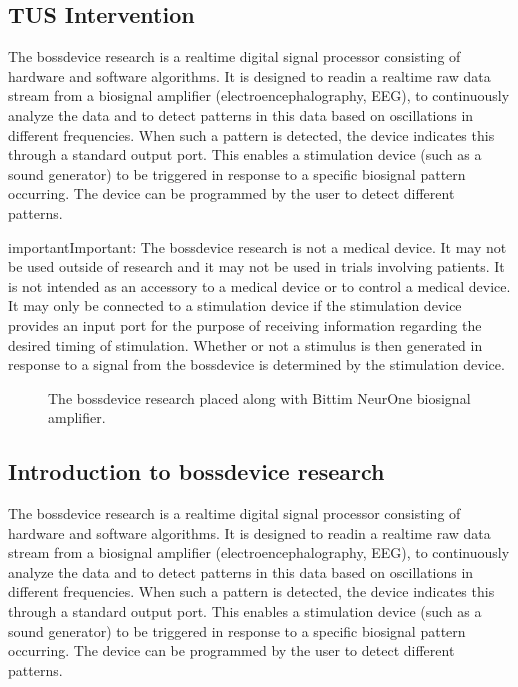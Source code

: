 \documentclass[letterpaper,10pt,english]{sphinxmanual}
\begin{document}
\subsection{TUS Intervention}
\label{\detokenize{13_TUSIntervention:tus-intervention}}\label{\detokenize{13_TUSIntervention::doc}}
\sphinxAtStartPar
The bossdevice research is a real\sphinxhyphen{}time digital signal processor consisting of hardware and software algorithms. It is designed to read\sphinxhyphen{}in a real\sphinxhyphen{}time raw data stream from a biosignal amplifier (electroencephalography, EEG), to continuously analyze the data and to detect patterns in this data based on oscillations in different frequencies. When such a pattern is detected, the device indicates this through a standard output port. This enables a stimulation device (such as a sound generator) to be triggered in response to a specific biosignal pattern occurring. The device can be programmed by the user to detect different patterns.

\begin{sphinxadmonition}{important}{Important:}
\sphinxAtStartPar
The bossdevice research is not a medical device. It may not be used outside of research and it may not be used in trials involving patients. It is not intended as an accessory to a medical device or to control a medical device. It may only be connected to a stimulation device if the stimulation device provides an input port for the purpose of receiving information regarding the desired timing of stimulation. Whether or not a stimulus is then generated in response to a signal from the bossdevice is determined by the stimulation device.
\end{sphinxadmonition}

\begin{figure}[htbp]
\centering
\capstart

\noindent{}
\caption{The bossdevice research placed along with Bittim NeurOne biosignal amplifier.}\label{\detokenize{13_TUSIntervention:id1}}\end{figure}


\subsection{Introduction to bossdevice research}
\label{\detokenize{14_TMSfMRIMeasurement:introduction-to-bossdevice-research}}\label{\detokenize{14_TMSfMRIMeasurement::doc}}
\sphinxAtStartPar
The bossdevice research is a real\sphinxhyphen{}time digital signal processor consisting of hardware and software algorithms. It is designed to read\sphinxhyphen{}in a real\sphinxhyphen{}time raw data stream from a biosignal amplifier (electroencephalography, EEG), to continuously analyze the data and to detect patterns in this data based on oscillations in different frequencies. When such a pattern is detected, the device indicates this through a standard output port. This enables a stimulation device (such as a sound generator) to be triggered in response to a specific biosignal pattern occurring. The device can be programmed by the user to detect different patterns.
\end{document}
